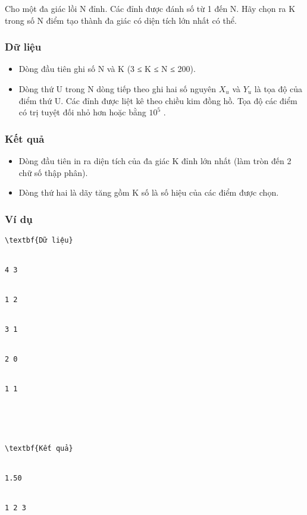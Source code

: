 







   Cho một đa giác lồi N đỉnh. Các đỉnh được đánh số từ 1 đến N. Hãy chọn ra K trong số N điểm tạo thành đa giác có diện tích lớn nhất có thể.  

\subsubsection{   Dữ liệu  }
\begin{itemize}
	\item     Dòng đầu tiên ghi số N và K (3 ≤ K ≤ N ≤ 200).   
	\item     Dòng thứ U trong N dòng tiếp theo ghi hai số nguyên $X_{u}$    và $Y_{u}$    là tọa độ của điểm thứ U. Các đỉnh được liệt kê theo chiều kim đồng hồ. Tọa độ các điểm có trị tuyệt đối nhỏ hơn hoặc bằng $10^{5}$    .   
\end{itemize}

\subsubsection{   Kết quả  }
\begin{itemize}
	\item     Dòng đầu tiên in ra diện tích của đa giác K đỉnh lớn nhất (làm tròn đến 2 chữ số thập phân).   
	\item     Dòng thứ hai là dãy tăng gồm K số là số hiệu của các điểm được chọn.   
\end{itemize}

\subsubsection{   Ví dụ  }
\begin{verbatim}
\textbf{Dữ liệu}


4 3


1 2


3 1


2 0


1 1





\textbf{Kết quả}


1.50


1 2 3


\end{verbatim}

